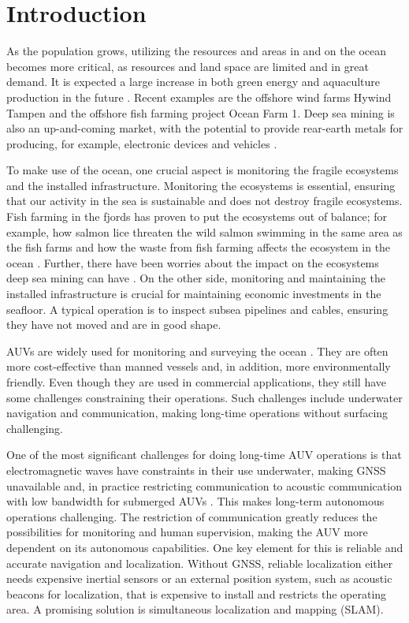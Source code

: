 \chapter{Introduction}

As the population grows, utilizing the resources and areas in and on the ocean becomes more critical, as resources and land space are limited and in great demand. It is expected a large increase in both green energy and aquaculture production in the future \cite{Oceans2050}. Recent examples are the offshore wind farms Hywind Tampen \cite{HywindEquinor} and the offshore fish farming project Ocean Farm 1\cite{HavbasertASA}. Deep sea mining is also an up-and-coming market, with the potential to provide rear-earth metals for producing, for example, electronic devices and vehicles \cite{Bogue2015UnderwaterApplications}.

To make use of the ocean, one crucial aspect is monitoring the fragile ecosystems and the installed infrastructure. Monitoring the ecosystems is essential, ensuring that our activity in the sea is sustainable and does not destroy fragile ecosystems. Fish farming in the fjords has proven to put the ecosystems out of balance; for example, how salmon lice threaten the wild salmon swimming in the same area as the fish farms and how the waste from fish farming affects the ecosystem in the ocean \cite{Fiskeoppdrett}. Further, there have been worries about the impact on the ecosystems deep sea mining can have \cite{UnderstandingTechnology}. On the other side, monitoring and maintaining the installed infrastructure is crucial for maintaining economic investments in the seafloor. A typical operation is to inspect subsea pipelines and cables, ensuring they have not moved and are in good shape. 

AUVs are widely used for monitoring and surveying the ocean \cite{Nicholson2008TheTechnologies, HaugstadDenManeder}. They are often more cost-effective than manned vessels and, in addition, more environmentally friendly. Even though they are used in commercial applications, they still have some challenges constraining their operations. Such challenges include underwater navigation and communication, making long-time operations without surfacing challenging. 

One of the most significant challenges for doing long-time AUV operations is that electromagnetic waves have constraints in their use underwater, making GNSS unavailable and, in practice restricting communication to acoustic communication with low bandwidth for submerged AUVs \cite{Nicholson2008TheTechnologies}. This makes long-term autonomous operations challenging. The restriction of communication greatly reduces the possibilities for monitoring and human supervision, making the AUV more dependent on its autonomous capabilities. One key element for this is reliable and accurate navigation and localization. Without GNSS, reliable localization either needs expensive inertial sensors or an external position system, such as acoustic beacons for localization, that is expensive to install and restricts the operating area. A promising solution is simultaneous localization and mapping (SLAM).

